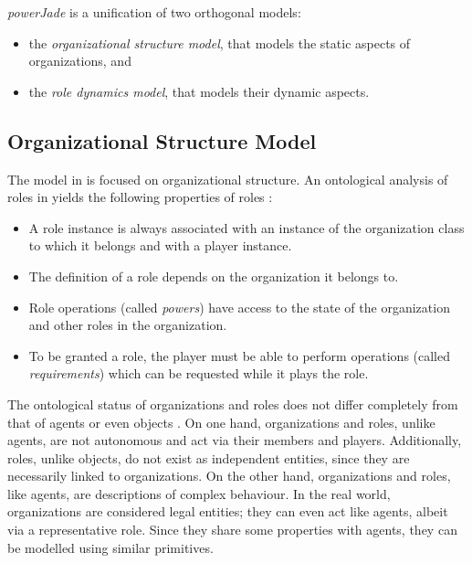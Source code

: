 \textit{powerJade} is a unification of two orthogonal models:
\begin{itemize}
	\item the \textit{organizational structure model}, that models the static aspects of organizations, and
	\item the \textit{role dynamics model}, that models their dynamic aspects.
\end{itemize}

\subsection*{Organizational Structure Model}

The model in \cite{Boella04} is focused on organizational structure.
An ontological analysis of roles in yields the following properties of roles \cite{Boella04}:
\begin{itemize}
	\item A role instance is always associated with an instance of the organization class to which it belongs and with a player instance.
	\item The definition of a role depends on the organization it belongs to.
	\item Role operations (called \textit{powers}) have access to the state of the organization and other roles in the organization.
	\item To be granted a role, the player must be able to perform operations (called \textit{requirements}) which can be requested while it plays the role.
\end{itemize}

The ontological status of organizations and roles does not differ completely from that of agents or even objects \cite{Boella04}.
On one hand, organizations and roles, unlike agents, are not autonomous and act via their members and players.
Additionally, roles, unlike objects, do not exist as independent entities, since they are necessarily linked to organizations.
On the other hand, organizations and roles, like agents, are descriptions of complex behaviour.
In the real world, organizations are considered legal entities; they can even act like agents, albeit via a representative role.
Since they share some properties with agents, they can be modelled using similar primitives.

